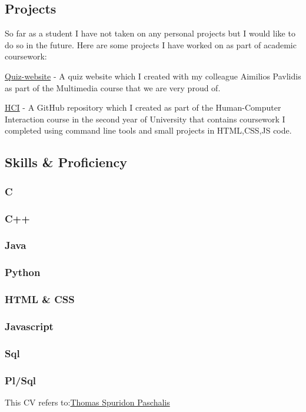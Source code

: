 \documentclass[english,]{article}
\begin{document}
\hypertarget{projects}{%
\subsection{\texorpdfstring{{ \emph{} \emph{} }
Projects}{    Projects}}\label{projects}}

So far as a student I have not taken on any personal projects but I
would like to do so in the future. Here are some projects I have worked
on as part of academic coursework:

{ \href{https://quiz-pliroforikis.netlify.app/}{Quiz-website} } - {A
quiz website which I created with my colleague Aimilios Pavlidis as part
of the Multimedia course that we are very proud of.}

{
\href{https://github.com/p19pasc/hci/tree/2019110/projects/2019110}{HCI}
} - {A GitHub repository which I created as part of the Human-Computer
Interaction course in the second year of University that contains
coursework I completed using command line tools and small projects in
HTML,CSS,JS code.}

\hypertarget{skills-proficiency}{%
\subsection{\texorpdfstring{{ \emph{} \emph{} } Skills \&
Proficiency}{    Skills \& Proficiency}}\label{skills-proficiency}}

\hypertarget{c}{%
\subsubsection{C}\label{c}}

\hypertarget{c-1}{%
\subsubsection{C++}\label{c-1}}

\hypertarget{java}{%
\subsubsection{Java}\label{java}}

\hypertarget{python}{%
\subsubsection{Python}\label{python}}

\hypertarget{html-css}{%
\subsubsection{HTML \& CSS}\label{html-css}}

\hypertarget{javascript}{%
\subsubsection{Javascript}\label{javascript}}

\hypertarget{sql}{%
\subsubsection{Sql}\label{sql}}

\hypertarget{plsql}{%
\subsubsection{Pl/Sql}\label{plsql}}

{This CV refers to:\href{https://github.com/p19pasc}{Thomas Spuridon
Paschalis}}
\end{document}
